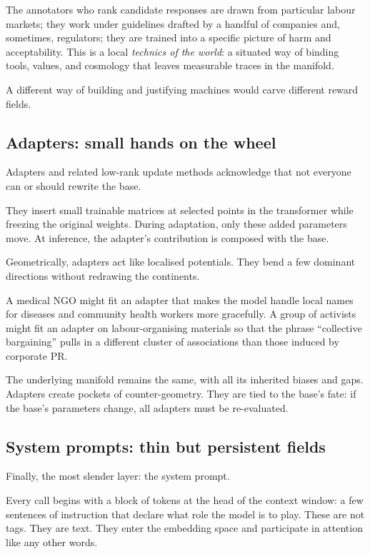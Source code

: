 The annotators who rank candidate responses are drawn from particular labour markets; they work under guidelines drafted by a handful of companies and, sometimes, regulators; they are trained into a specific picture of harm and acceptability. This is a local \emph{technics of the world}: a situated way of binding tools, values, and cosmology that leaves measurable traces in the manifold.

A different way of building and justifying machines would carve different reward fields.

\subsection*{Adapters: small hands on the wheel}

Adapters and related low-rank update methods acknowledge that not everyone can or should rewrite the base.

They insert small trainable matrices at selected points in the transformer while freezing the original weights. During adaptation, only these added parameters move. At inference, the adapter's contribution is composed with the base.

Geometrically, adapters act like localised potentials. They bend a few dominant directions without redrawing the continents.

A medical NGO might fit an adapter that makes the model handle local names for diseases and community health workers more gracefully. A group of activists might fit an adapter on labour-organising materials so that the phrase ``collective bargaining'' pulls in a different cluster of associations than those induced by corporate PR.

The underlying manifold remains the same, with all its inherited biases and gaps. Adapters create pockets of counter-geometry. They are tied to the base's fate: if the base's parameters change, all adapters must be re-evaluated.

\subsection*{System prompts: thin but persistent fields}

Finally, the most slender layer: the system prompt.

Every call begins with a block of tokens at the head of the context window: a few sentences of instruction that declare what role the model is to play. These are not tags. They are text. They enter the embedding space and participate in attention like any other words.

